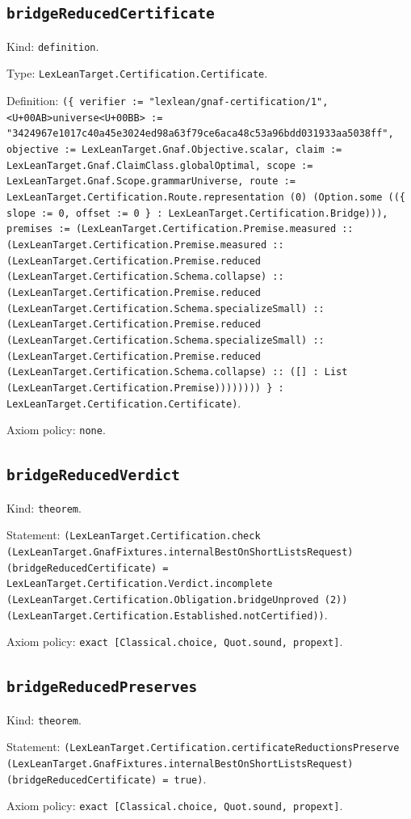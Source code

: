 \documentclass[11pt]{article}
\begin{document}
\subsection*{\texttt{bridgeReducedCertificate}}
\noindent Kind: \texttt{definition}.\par
\noindent Type: \texttt{LexLeanTarget.Certification.Certificate}.\par
\noindent Definition: \texttt{(\{ verifier := "lexlean/gnaf-certification/1", <U+00AB>universe<U+00BB> := "3424967e1017c40a45e3024ed98a63f79ce6aca48c53a96bdd031933aa5038ff", objective := LexLeanTarget.Gnaf.Objective.scalar, claim := LexLeanTarget.Gnaf.ClaimClass.globalOptimal, scope := LexLeanTarget.Gnaf.Scope.grammarUniverse, route := LexLeanTarget.Certification.Route.representation (0) (Option.some ((\{ slope := 0, offset := 0 \} : LexLeanTarget.Certification.Bridge))), premises := (LexLeanTarget.Certification.Premise.measured :: (LexLeanTarget.Certification.Premise.measured :: (LexLeanTarget.Certification.Premise.reduced (LexLeanTarget.Certification.Schema.collapse) :: (LexLeanTarget.Certification.Premise.reduced (LexLeanTarget.Certification.Schema.specializeSmall) :: (LexLeanTarget.Certification.Premise.reduced (LexLeanTarget.Certification.Schema.specializeSmall) :: (LexLeanTarget.Certification.Premise.reduced (LexLeanTarget.Certification.Schema.collapse) :: ([] : List (LexLeanTarget.Certification.Premise)))))))) \} : LexLeanTarget.Certification.Certificate)}.\par
\noindent Axiom policy: \texttt{none}.\par
\subsection*{\texttt{bridgeReducedVerdict}}
\noindent Kind: \texttt{theorem}.\par
\noindent Statement: \texttt{(LexLeanTarget.Certification.check (LexLeanTarget.GnafFixtures.internalBestOnShortListsRequest) (bridgeReducedCertificate) = LexLeanTarget.Certification.Verdict.incomplete (LexLeanTarget.Certification.Obligation.bridgeUnproved (2)) (LexLeanTarget.Certification.Established.notCertified))}.\par
\noindent Axiom policy: \texttt{exact [Classical.choice, Quot.sound, propext]}.\par
\subsection*{\texttt{bridgeReducedPreserves}}
\noindent Kind: \texttt{theorem}.\par
\noindent Statement: \texttt{(LexLeanTarget.Certification.certificateReductionsPreserve (LexLeanTarget.GnafFixtures.internalBestOnShortListsRequest) (bridgeReducedCertificate) = true)}.\par
\noindent Axiom policy: \texttt{exact [Classical.choice, Quot.sound, propext]}.\par
\end{document}
